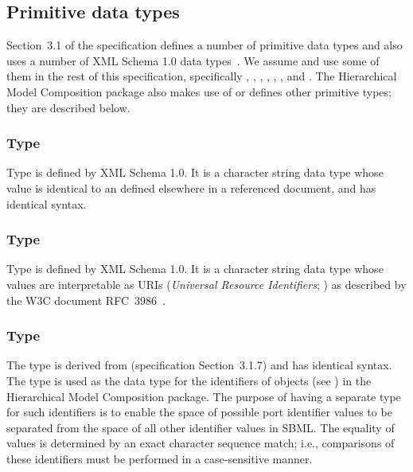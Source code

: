\subsection{Primitive data types}
\label{new-primitive-types}

Section~3.1 of the \sbmlthreecore specification defines a number of
primitive data types and also uses a number of XML Schema 1.0 data
types~\citep{biron:2000}.  We assume and use some of them in the rest of
this specification, specifically , ,
, , ,
, and .  The Hierarchical Model
Composition package also makes use of or defines other primitive types;
they are described below.


\subsubsection{Type \fixttspace{}}
\label{primtype-idref}

Type  is defined by XML Schema 1.0.  It is a character
string data type whose value is identical to an  defined 
elsewhere in a referenced document, and has identical syntax.


\subsubsection{Type \fixttspace{}}
\label{primtype-anyuri}
\label{primtype-uri}

Type  is defined by XML Schema 1.0.  It is a character
string data type whose values are interpretable as URIs (\emph{Universal
  Resource Identifiers}; \citealt{harold:2001,w3c:2000}) as described by
the W3C document RFC~3986~\citep{rfc3986}.


\subsubsection{Type \fixttspace{}}
\label{primtype-portid}

The type  is derived from 
(\sbmlthreecore specification Section~3.1.7) and has identical syntax.
The  type is used as the data type for the identifiers
of \Port objects (see ) in the Hierarchical Model
Composition package.  The purpose of having a separate type for such
identifiers is to enable the space of possible port identifier values to
be separated from the space of all other identifier values in SBML.  The
equality of  values is determined by an exact
character sequence match; i.e., comparisons of these identifiers must be
performed in a case-sensitive manner.


